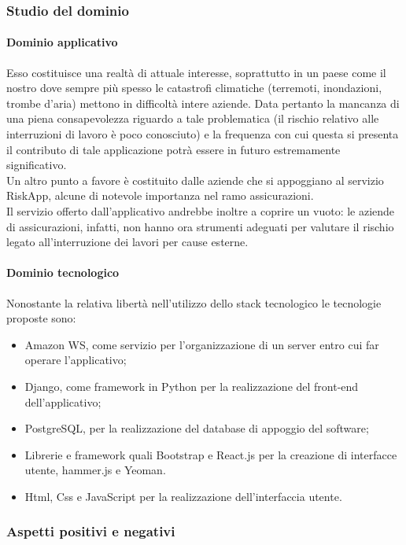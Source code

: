 		\subsubsection{Studio del dominio}
			\paragraph{Dominio applicativo}
			Esso costituisce una realtà di attuale interesse, soprattutto in un paese come il nostro dove sempre più spesso le catastrofi climatiche 
			(terremoti, inondazioni, trombe d'aria) mettono in difficoltà intere aziende. Data pertanto la mancanza di una piena consapevolezza 
			riguardo a tale problematica (il rischio relativo alle interruzioni di lavoro è poco conosciuto) e la frequenza con cui questa si presenta 
			il contributo di tale applicazione potrà essere in futuro estremamente significativo.
			\\Un altro punto a favore è costituito dalle aziende che si appoggiano al servizio RiskApp, alcune di notevole importanza nel ramo assicurazioni.
			\\Il servizio offerto dall'applicativo andrebbe inoltre a coprire un vuoto: le aziende di assicurazioni, infatti, non hanno ora strumenti 
			adeguati per valutare il rischio legato all'interruzione dei lavori per cause esterne.
			\paragraph{Dominio tecnologico}
			Nonostante la relativa libertà nell'utilizzo dello stack tecnologico le tecnologie proposte sono:
			\begin{itemize}
				\item Amazon WS, come servizio per l'organizzazione di un server entro cui far operare l'applicativo;
				\item Django, come framework in Python per la realizzazione del front-end dell'applicativo;
				\item PostgreSQL, per la realizzazione del database di appoggio del software;
				\item Librerie e framework quali Bootstrap e React.js per la creazione di interfacce utente, hammer.js e Yeoman.
				\item Html, Css e JavaScript per la realizzazione dell'interfaccia utente.
			\end{itemize}
		\subsubsection{Aspetti positivi e negativi}
